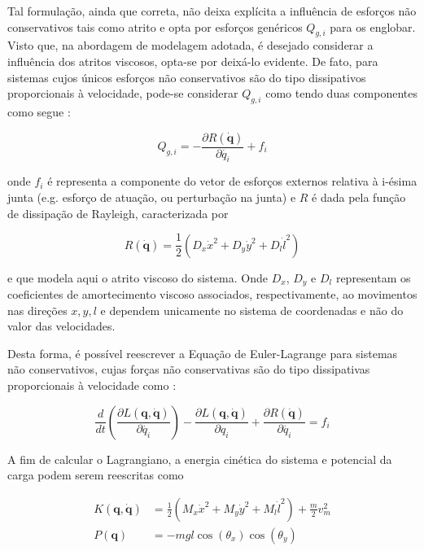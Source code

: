 \documentclass{ppgeesa}
\begin{document}
Tal formulação, ainda que correta, não deixa explícita a influência de esforços não conservativos tais como atrito e opta por esforços genéricos $Q_{g,i}$ para os englobar. Visto que, na abordagem de modelagem adotada, é desejado considerar a influência dos atritos viscosos, opta-se por deixá-lo evidente. De fato, para sistemas cujos únicos esforços não conservativos são do tipo dissipativos proporcionais à velocidade, pode-se considerar $Q_{g,i}$ como tendo duas componentes como segue \cite{Meirovitch2012}: %

\begin{equation}
  Q_{g,i} = -\frac{\partial R(\dot{\mathbf{q}})}{\partial \dot{q_i}} + f_{i}
\end{equation}

\noindent onde $f_i$ é representa a componente do vetor de esforços externos relativa à i-ésima junta (e.g. esforço de atuação, ou perturbação na junta) e $R$ é dada pela função de dissipação de Rayleigh, caracterizada por

\begin{equation}
  R(\dot{\mathbf{q}}) = \frac{1}{2}\left(D_x\dot{x}^2+D_y\dot{y}^2+D_l\dot{l}^2\right)\label{eq:rayleigh}
\end{equation}

\noindent e que modela aqui o atrito viscoso do sistema. Onde $D_x$, $D_y$ e $D_l$ representam os coeficientes de amortecimento viscoso associados, respectivamente, ao movimentos nas direções $x,y,l$ e dependem unicamente no sistema de coordenadas e não do valor das velocidades.

Desta forma, é possível reescrever a Equação de Euler-Lagrange para sistemas não conservativos, cujas forças não conservativas são do tipo dissipativas proporcionais à velocidade como \cite{thiago2026}:

\begin{equation}
  \frac{d}{dt}\left(\frac{\partial L(\mathbf{q}, \dot{\mathbf{q}})}{\partial \dot{q_i}}\right) - \frac{\partial L(\mathbf{q}, \dot{\mathbf{q}})}{\partial q_i} + \frac{\partial R(\dot{\mathbf{q}})}{\partial \dot{q_i}} = f_{i}\label{eq:euler_lagrange_non_conservative}
\end{equation}

A fim de calcular o Lagrangiano, a energia cinética do sistema e potencial da carga podem serem reescritas como

\begin{align}
  K(\mathbf{q}, \dot{\mathbf{q}}) &= \frac{1}{2}(M_x \dot{x}^2 + M_y \dot{y}^2 + M_{l} \dot{l}^2) + \frac{m}{2} v_m^2 \label{eq:kinematic_en}\\
  P(\mathbf{q}) &= -m g l \cos(\theta_x) \cos(\theta_y)\label{eq:potential_en}
\end{align}
\end{document}
